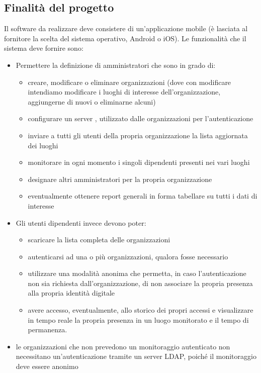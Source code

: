 \documentclass[../studio-di-fattibilita.tex]{subfiles}
\begin{document}
  \subsection{Finalità del progetto}%
  \label{subsec:finalita_del_progetto}
  Il software da realizzare deve consistere di un'applicazione mobile (è lasciata al fornitore la scelta del sistema operativo, Android o iOS). Le funzionalità che il sistema deve fornire sono:
  \begin{itemize}
    \item Permettere la definizione di amministratori che sono in grado di:
    \begin{itemize}
        \item creare, modificare o eliminare organizzazioni (dove con modificare intendiamo modificare i luoghi di interesse dell’organizzazione, aggiungerne di nuovi o eliminarne alcuni)
        \item configurare un server , utilizzato dalle organizzazioni per l'autenticazione
        \item inviare a tutti gli utenti della propria organizzazione la lista aggiornata dei luoghi
        \item monitorare in ogni momento i singoli dipendenti presenti nei vari luoghi
        \item designare altri amministratori per la propria organizzazione
        \item eventualmente ottenere report generali in forma tabellare su tutti i dati di interesse
    \end{itemize}
    \item Gli utenti dipendenti invece devono poter:
    \begin{itemize}
        \item scaricare la lista completa delle organizzazioni
        \item autenticarsi ad una o più organizzazioni, qualora fosse necessario
        \item utilizzare una modalità anonima che permetta, in caso l’autenticazione non sia richiesta dall’organizzazione, di non associare la propria presenza alla propria identità digitale
        \item avere accesso, eventualmente, allo storico dei propri accessi e visualizzare in tempo reale la propria presenza in un luogo monitorato e il tempo di permanenza.
    \end{itemize}
    \item le organizzazioni che non prevedono un monitoraggio autenticato non necessitano un'autenticazione tramite un server LDAP, poiché il monitoraggio deve essere anonimo

\end{itemize}
\end{document}

